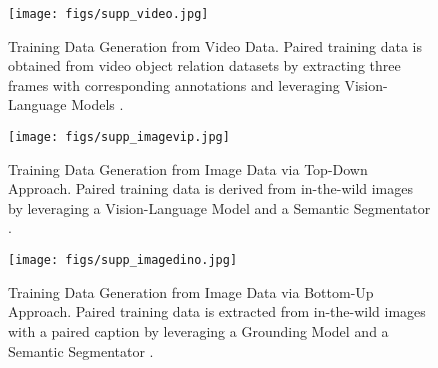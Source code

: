 \begin{figure}[t]
    \centering
    \texttt{[image: figs/supp\_video.jpg]}
    \caption{Training Data Generation from Video Data. Paired training data is obtained from video object relation datasets \cite{shang2017video,shang2019annotating} by extracting three frames with corresponding annotations and leveraging Vision-Language Models \cite{liu2023improvedllava}.}
    \label{fig:suppvideo}
\end{figure}

\begin{figure}[t]
    \centering
    \texttt{[image: figs/supp\_imagevip.jpg]}
    \caption{Training Data Generation from Image Data via Top-Down Approach. Paired training data is derived from in-the-wild images by leveraging a Vision-Language Model \cite{cai2024vip} and a Semantic Segmentator \cite{qi2022entityseg}.}
    \label{fig:suppimagevip}
\end{figure}

\begin{figure}[t]
    \centering
    \texttt{[image: figs/supp\_imagedino.jpg]}
    \caption{Training Data Generation from Image Data via Bottom-Up Approach. Paired training data is extracted from in-the-wild images with a paired caption by leveraging a Grounding Model \cite{liu2023groundingdino} and a Semantic Segmentator \cite{qi2022entityseg}.}
    \label{fig:suppimagedino}
\end{figure}



